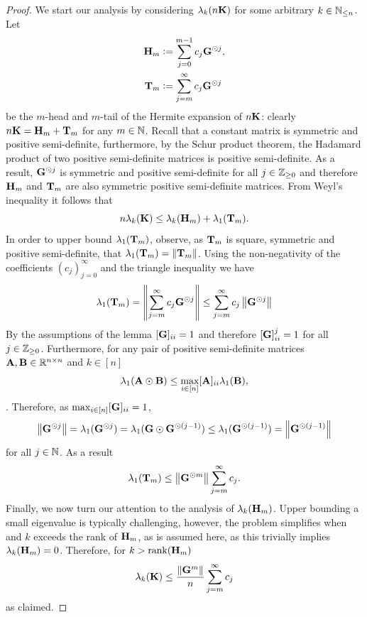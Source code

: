 \begin{proof}
    We start our analysis by considering $\lambda_k(n\mathbf{K})$ for some arbitrary $k \in \mathbb{N}_{\leq n}$. Let
    \[
    \begin{aligned}
    \mathbf{H}_m &\vcentcolon=  \sum_{j=0}^{m-1} c_j \mathbf{G}^{\odot j},\\
    \mathbf{T}_m &\vcentcolon= \sum_{j=m}^{\infty} c_j \mathbf{G}^{\odot j}
    \end{aligned}
    \]
    be the $m$-head and $m$-tail of the Hermite expansion of $n\mathbf{K}$: clearly $n\mathbf{K} = \mathbf{H}_m + \mathbf{T}_m$ for any $m \in \mathbb{N}$.  Recall that a constant matrix is symmetric and positive semi-definite, furthermore, by the Schur product theorem, the Hadamard product of two positive semi-definite matrices is positive semi-definite.  As a result, $\mathbf{G}^{\odot j}$ is symmetric and positive semi-definite for all $j \in \mathbb{Z}_{\geq 0}$ and therefore $\mathbf{H}_m$ and $\mathbf{T}_m$ are also symmetric positive semi-definite matrices. 
    From Weyl's inequality \cite[Satz~1]{Weyl} it follows that
    \begin{equation}\label{eq:weyl}
        n\lambda_k(\mathbf{K}) \leq \lambda_k(\mathbf{H}_m) + \lambda_1(\mathbf{T}_m) . 
    \end{equation}
    In order to upper bound $\lambda_1(\mathbf{T}_m)$, observe, as $\mathbf{T}_m$ is square, symmetric and positive semi-definite, that $\lambda_1(\mathbf{T}_m) = \left\lVert\mathbf{T}_m\right\rVert$.  Using the non-negativity of the coefficients $(c_j)_{j=0}^{\infty}$ and the triangle inequality we have
    \[
    \begin{aligned}
    \lambda_1(\mathbf{T}_m)
     =\left\lVert\sum_{j=m}^{\infty} c_j \mathbf{G}^{\odot j}\right\rVert \leq \sum_{j=m}^{\infty} c_j \left\lVert\mathbf{G}^{\odot j}\right\rVert
    \end{aligned}
    \]
    By the assumptions of the lemma $[\mathbf{G}]_{ii} = 1$ and therefore $[\mathbf{G}]_{ii}^j = 1$ for all $j \in \mathbb{Z}_{\geq 0}$. Furthermore, for any pair of positive semi-definite matrices $\mathbf{A}, \mathbf{B} \in \mathbb{R}^{n \times n}$ and $k \in [n]$ 
    \begin{equation}
    \lambda_{1}(\mathbf{A} \odot \mathbf{B}) \leq \max_{i \in [n]} [\mathbf{A}]_{ii} \lambda_{1}(\mathbf{B}),
    \end{equation}
    \cite{Schur1911}. Therefore, as $\max_{i \in [n]} [\mathbf{G}]_{ii} = 1$,
    \[
    \left\lVert\mathbf{G}^{\odot j}\right\rVert = \lambda_1(\mathbf{G}^{\odot j}) = \lambda_1(\mathbf{G} \odot \mathbf{G}^{\odot (j-1)}) \leq \lambda_1(\mathbf{G}^{\odot (j-1)}) = \left\lVert\mathbf{G}^{\odot (j-1)}\right\rVert
    \]
    for all $j \in \mathbb{N}$. As a result
    \[
    \begin{aligned}
    \lambda_1(\mathbf{T}_m) \leq \left\lVert\mathbf{G}^{\odot m}\right\rVert \sum_{j=m}^{\infty} c_j.
    \end{aligned}
    \]
    Finally, we now turn our attention to the analysis of $\lambda_k(\mathbf{H}_m)$. Upper bounding a small eigenvalue is typically challenging, however, the problem simplifies when and $k$ exceeds the rank of $\mathbf{H}_m$, as is assumed here, as this trivially implies $\lambda_k(\mathbf{H}_m) = 0$. Therefore, for $k > \operatorname{rank}(\mathbf{H}_m)$
    \[
    \lambda_k(\mathbf{K}) \leq \frac{\left\lVert\mathbf{G}^m\right\rVert}{n} \sum_{j=m}^{\infty} c_j 
    \]
    as claimed.
\end{proof}

